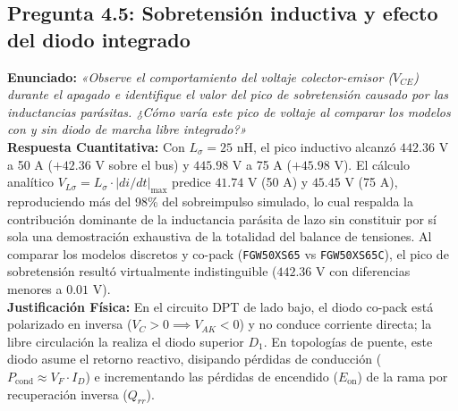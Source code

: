 \documentclass[11pt,a4paper]{article}
\begin{document}
\subsection{Pregunta 4.5: Sobretensión inductiva y efecto del diodo integrado}
\textbf{Enunciado:} \textit{«Observe el comportamiento del voltaje colector-emisor ($V_{CE}$) durante el apagado e identifique el valor del pico de sobretensión causado por las inductancias parásitas. ¿Cómo varía este pico de voltaje al comparar los modelos con y sin diodo de marcha libre integrado?»}\\
\textbf{Respuesta Cuantitativa:} Con $L_\sigma = 25\text{ nH}$, el pico inductivo alcanzó $442.36\text{ V}$ a 50 A ($+42.36\text{ V}$ sobre el bus) y $445.98\text{ V}$ a 75 A ($+45.98\text{ V}$). El cálculo analítico $V_{L\sigma} = L_\sigma \cdot |di/dt|_{\max}$ predice $41.74\text{ V}$ (50 A) y $45.45\text{ V}$ (75 A), reproduciendo más del 98\% del sobreimpulso simulado, lo cual respalda la contribución dominante de la inductancia parásita de lazo sin constituir por sí sola una demostración exhaustiva de la totalidad del balance de tensiones. Al comparar los modelos discretos y co-pack (\texttt{FGW50XS65} vs \texttt{FGW50XS65C}), el pico de sobretensión resultó virtualmente indistinguible ($442.36\text{ V}$ con diferencias menores a $0.01\text{ V}$).\\
\textbf{Justificación Física:} En el circuito DPT de lado bajo, el diodo co-pack está polarizado en inversa ($V_C > 0 \implies V_{AK} < 0$) y no conduce corriente directa; la libre circulación la realiza el diodo superior $D_1$. En topologías de puente, este diodo asume el retorno reactivo, disipando pérdidas de conducción ($P_{\text{cond}} \approx V_F \cdot I_D$) e incrementando las pérdidas de encendido ($E_{\text{on}}$) de la rama por recuperación inversa ($Q_{rr}$).
\end{document}
